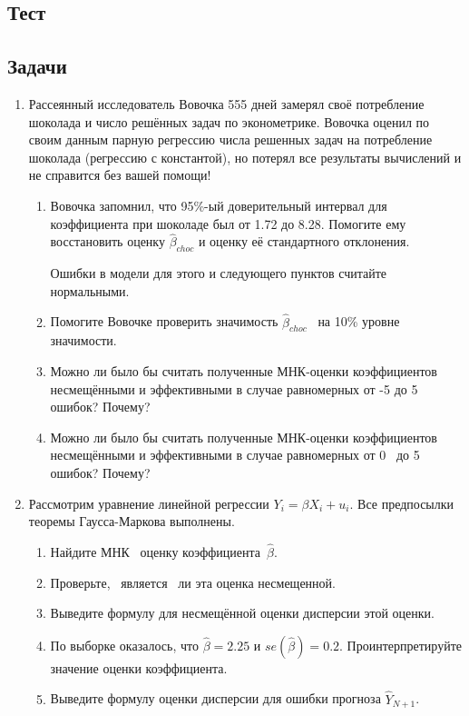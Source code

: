 \documentclass[12pt]{article}
\def \hb{\hat{\beta}}
\def \putyourname{\fbox{
    \begin{minipage}{42em}
      Фамилия, имя, номер группы:\vspace*{3ex}\par
      \noindent\dotfill\vspace{2mm}
    \end{minipage}
  }
}
\def \checktable{
\begin{minipage}{42em}
\begin{tabular}{|m{2cm}|m{2cm}|m{2cm}|m{2cm}|m{2cm}|}
\hline
Тест & 1 &  2 & 3 & Итого \\ \hline
&  &  &  & \\
 &  &   & & \\
 \hline
\end{tabular} $\longleftarrow$ для проверяющего!
\end{minipage}
}
\def \testtable{
\begin{minipage}{42em}
\vspace{4pt}

Ответы на тест:

\vspace{2pt}
\begin{tabular}{|m{1cm}|m{1cm}|m{1cm}|m{1cm}|m{1cm}|m{1cm}|m{1cm}|m{1cm}|m{1cm}|m{1cm}|}
\hline
1 & 2 &  3 & 4 & 5 & 6 & 7 & 8 & 9 & 10 \\ 
\hline
 &  &   &  &  &  &  &  &  &  \\ 
 &  &   &  &  &  &  &  &  &  \\ 
\hline
\end{tabular}
\end{minipage}

}
\theoremstyle{definition}
\begin{document}



\subsection*{Тест}



\subsection*{Задачи}

\begin{enumerate}


\item Рассеянный исследователь Вовочка 555 дней замерял своё потребление шоколада 
и число решённых задач по эконометрике. 
Вовочка оценил по своим данным парную регрессию числа решенных задач на потребление шоколада 
(регрессию с константой), но потерял все результаты вычислений и не справится без вашей помощи!

\begin{enumerate}
    \item Вовочка запомнил, что 95\%-ый доверительный интервал для коэффициента 
    при шоколаде был от 1.72 до 8.28. Помогите ему восстановить оценку $\hat\beta_{choc}$  и оценку её стандартного отклонения. 
  
    Ошибки в модели для этого и следующего пунктов считайте нормальными.
\item Помогите Вовочке проверить значимость  $\hat\beta_{choc}$  на 10\% уровне значимости.
\item Можно ли было бы считать полученные МНК-оценки коэффициентов несмещёнными и эффективными 
в случае равномерных от -5 до 5 ошибок? Почему?
\item Можно ли было бы считать полученные МНК-оценки коэффициентов несмещёнными и эффективными 
в случае равномерных от 0  до 5 ошибок? Почему?
\end{enumerate}


\item Рассмотрим уравнение линейной регрессии $Y_i = \beta X_i + u_i$. 
Все предпосылки теоремы Гаусса-Маркова выполнены.
\begin{enumerate}
\item Найдите МНК  оценку коэффициента $\hb$.
\item Проверьте,  является  ли эта оценка несмещенной.
\item Выведите формулу для несмещённой оценки дисперсии этой оценки. 
\item По выборке оказалось, что $\hb = 2.25$ и $se(\hb)=0.2$. 
Проинтерпретируйте значение оценки коэффициента.
\item Выведите формулу оценки дисперсии для ошибки прогноза $\hat Y_{N+1}$.
\end{enumerate}


\end{enumerate}
\end{document}
